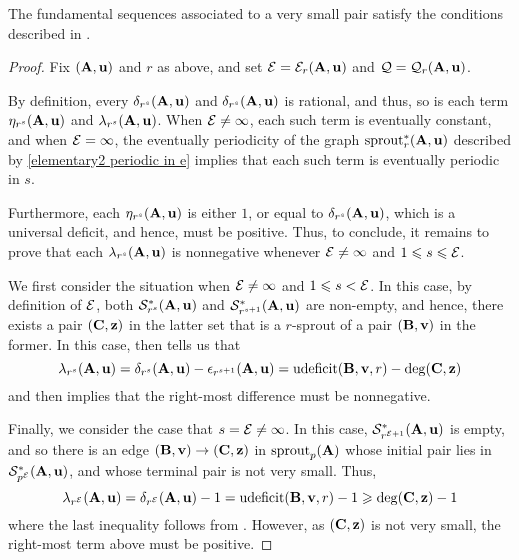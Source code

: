 \documentclass{article}
\begin{document}
\begin{proposition}
\label{finishing-with-the-fundamental-sequences: P}
The fundamental sequences associated to a very small pair satisfy the conditions described in .  
\end{proposition}

\begin{proof} 
   Fix $(\mathbf{A},\mathbf{u})$ and $r$ as above, and set $\mathcal{E}=\mathcal{E}_r(\mathbf{A},\mathbf{u})$ and $\mathcal{Q} = \mathcal{Q}_r(\mathbf{A},\mathbf{u})$.  
   
   By definition, every $\delta_{r^s}(\mathbf{A}, \mathbf{u})$ and $\delta_{r^s}(\mathbf{A}, \mathbf{u})$ is rational, and thus, so is each term $\eta_{r^s}(\mathbf{A}, \mathbf{u})$ and $\lambda_{r^s}(\mathbf{A}, \mathbf{u})$.  When $\mathcal{E} \neq \infty$,  each such term is eventually constant, and when $\mathcal{E} = \infty$,  the eventually periodicity of the graph $\operatorname{sprout}_r^{\ast}(\mathbf{A}, \mathbf{u})$ described by \eqref{elementary2 periodic in e} implies that each such term is eventually periodic in $s$.  
   
Furthermore, each $\eta_{r^s}(\mathbf{A}, \mathbf{u})$ is either $1$, or equal to $\delta_{r^s}(\mathbf{A}, \mathbf{u})$, which is a universal deficit, and hence, must be positive.  Thus, to conclude, it remains to prove that each $\lambda_{r^s}(\mathbf{A}, \mathbf{u})$ is nonnegative whenever $\mathcal{E} \neq \infty$ and $1 \leqslant s \leqslant \mathcal{E}$.

We first consider the situation when $\mathcal{E} \neq \infty$ and $1 \leqslant s < \mathcal{E}$.   In this case, by definition of $\mathcal{E}$, both $\mathcal{S}_{r^{s}}^{\ast}(\mathbf{A}, \mathbf{u})$ and $\mathcal{S}_{r^{s+1}}^{\ast}(\mathbf{A}, \mathbf{u})$ are non-empty, and hence, there exists a pair $(\mathbf{C}, \mathbf{z})$ in the latter set that is a $r$-sprout of a pair $(\mathbf{B}, \mathbf{v})$ in the former.  In this case,  then tells us that 
\[ \lambda_{r^s}(\mathbf{A}, \mathbf{u}) = \delta_{r^s}(\mathbf{A}, \mathbf{u}) - \epsilon_{r^{s+1}}(\mathbf{A}, \mathbf{u}) = \operatorname{udeficit}(\mathbf{B}, \mathbf{v}, r) - \deg(\mathbf{C}, \mathbf{z}) \]  
 and  then implies that the right-most difference must be nonnegative.  
 
Finally, we consider the case that $s = \mathcal{E} \neq \infty$.  In this case,  $\mathcal{S}^{\ast}_{r^{\mathcal{E}+1}}(\mathbf{A},\mathbf{u})$ is empty, and so there is an edge $(\mathbf{B},\mathbf{v}) \to (\mathbf{C},\mathbf{z})$ in $\operatorname{sprout}_p(\mathbf{A})$ whose initial pair lies in $\mathcal{S}^{\ast}_{p^{\mathcal{E}}}(\mathbf{A},\mathbf{u})$, and whose terminal pair is not very small. Thus, 
\[ \lambda_{r^{\mathcal{E}}}(\mathbf{A}, \mathbf{u}) = \delta_{r^{\mathcal{E}}}(\mathbf{A}, \mathbf{u}) - 1 = \operatorname{udeficit}(\mathbf{B}, \mathbf{v}, r) - 1 \geqslant \deg(\mathbf{C}, \mathbf{z}) - 1   \] where the last inequality follows from .   However, as $(\mathbf{C}, \mathbf{z})$ is not very small, the right-most term above must be positive.
\end{proof}
\end{document}
